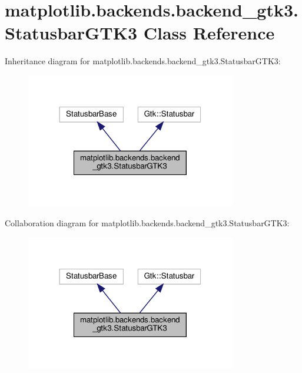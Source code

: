 \hypertarget{classmatplotlib_1_1backends_1_1backend__gtk3_1_1StatusbarGTK3}{}\section{matplotlib.\+backends.\+backend\+\_\+gtk3.\+Statusbar\+G\+T\+K3 Class Reference}
\label{classmatplotlib_1_1backends_1_1backend__gtk3_1_1StatusbarGTK3}


Inheritance diagram for matplotlib.\+backends.\+backend\+\_\+gtk3.\+Statusbar\+G\+T\+K3\+:
\nopagebreak
\begin{figure}[H]
\begin{center}
\leavevmode
\includegraphics[width=260pt]{classmatplotlib_1_1backends_1_1backend__gtk3_1_1StatusbarGTK3__inherit__graph}
\end{center}
\end{figure}


Collaboration diagram for matplotlib.\+backends.\+backend\+\_\+gtk3.\+Statusbar\+G\+T\+K3\+:
\nopagebreak
\begin{figure}[H]
\begin{center}
\leavevmode
\includegraphics[width=260pt]{classmatplotlib_1_1backends_1_1backend__gtk3_1_1StatusbarGTK3__coll__graph}
\end{center}
\end{figure}
